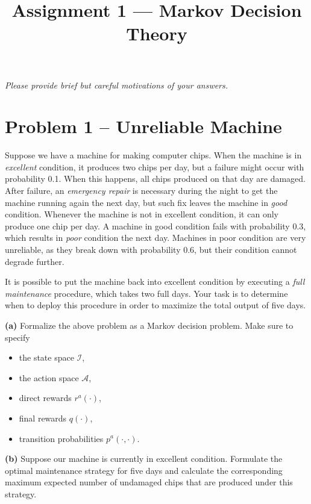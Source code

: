 \documentclass{article}
\title{Assignment 1 --- Markov Decision Theory}
\author{}
\date{}
\begin{document}
\maketitle
\vspace{-5em}

\noindent
\textit{Please provide brief but careful motivations of your answers.}

\section*{Problem 1 -- Unreliable Machine}

Suppose we have a machine for making computer chips.
When the machine is in \textit{excellent} condition, it produces two chips per day, but
a failure might occur with probability 0.1. 
When this happens, all chips produced on that day are damaged.
After failure, an \textit{emergency repair} is necessary during the night to get the machine running again the next day, but such fix leaves the machine in \textit{good} condition.
Whenever the machine is not in excellent condition, it can only produce one chip per day.
A machine in good condition fails with probability 0.3, which results in \textit{poor} condition the next day.
Machines in poor condition are very unreliable, as they break down with probability 0.6, but their condition cannot degrade further.

It is possible to put the machine back into excellent condition by executing a \textit{full maintenance} procedure, which takes two full days.
Your task is to determine when to deploy this procedure in order to maximize the total output of five days.


\vspace{1em}
\noindent
\textbf{(a)}
Formalize the above problem as a Markov decision problem. Make sure to specify
\begin{itemize}
    \item the state space $\mathcal{I}$,
    \item the action space $\mathcal{A}$,
    \item direct rewards $r^{a}(\cdot)$,
    \item final rewards $q(\cdot)$,
    \item transition probabilities $p^{a}(\cdot, \cdot)$.
\end{itemize}

\vspace{1em}
\noindent
\textbf{(b)}
Suppose our machine is currently in excellent condition.
Formulate the optimal maintenance strategy for five days and calculate the corresponding maximum expected number of undamaged chips that are produced under this strategy.
\end{document}
